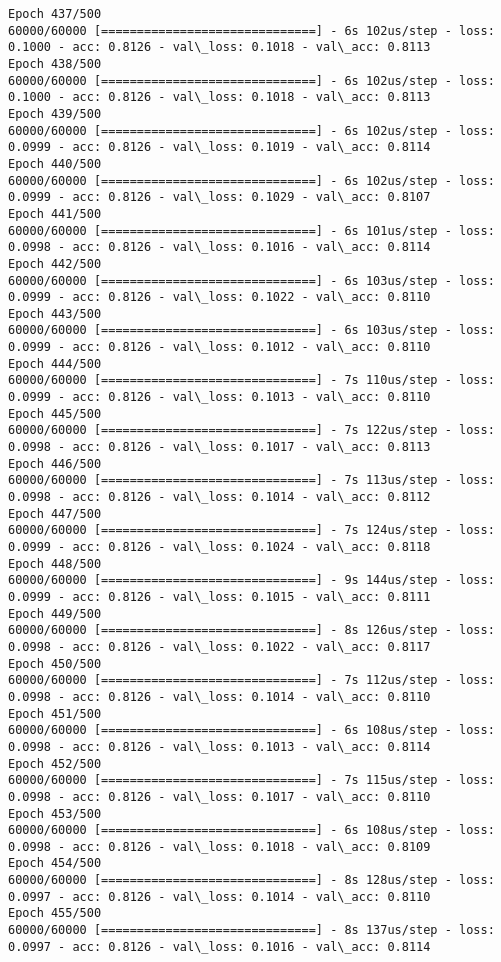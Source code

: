 \documentclass[11pt]{article}
\begin{document}
\begin{Verbatim}[commandchars=\\\{\}]
Epoch 437/500
60000/60000 [==============================] - 6s 102us/step - loss: 0.1000 - acc: 0.8126 - val\_loss: 0.1018 - val\_acc: 0.8113
Epoch 438/500
60000/60000 [==============================] - 6s 102us/step - loss: 0.1000 - acc: 0.8126 - val\_loss: 0.1018 - val\_acc: 0.8113
Epoch 439/500
60000/60000 [==============================] - 6s 102us/step - loss: 0.0999 - acc: 0.8126 - val\_loss: 0.1019 - val\_acc: 0.8114
Epoch 440/500
60000/60000 [==============================] - 6s 102us/step - loss: 0.0999 - acc: 0.8126 - val\_loss: 0.1029 - val\_acc: 0.8107
Epoch 441/500
60000/60000 [==============================] - 6s 101us/step - loss: 0.0998 - acc: 0.8126 - val\_loss: 0.1016 - val\_acc: 0.8114
Epoch 442/500
60000/60000 [==============================] - 6s 103us/step - loss: 0.0999 - acc: 0.8126 - val\_loss: 0.1022 - val\_acc: 0.8110
Epoch 443/500
60000/60000 [==============================] - 6s 103us/step - loss: 0.0999 - acc: 0.8126 - val\_loss: 0.1012 - val\_acc: 0.8110
Epoch 444/500
60000/60000 [==============================] - 7s 110us/step - loss: 0.0999 - acc: 0.8126 - val\_loss: 0.1013 - val\_acc: 0.8110
Epoch 445/500
60000/60000 [==============================] - 7s 122us/step - loss: 0.0998 - acc: 0.8126 - val\_loss: 0.1017 - val\_acc: 0.8113
Epoch 446/500
60000/60000 [==============================] - 7s 113us/step - loss: 0.0998 - acc: 0.8126 - val\_loss: 0.1014 - val\_acc: 0.8112
Epoch 447/500
60000/60000 [==============================] - 7s 124us/step - loss: 0.0999 - acc: 0.8126 - val\_loss: 0.1024 - val\_acc: 0.8118
Epoch 448/500
60000/60000 [==============================] - 9s 144us/step - loss: 0.0999 - acc: 0.8126 - val\_loss: 0.1015 - val\_acc: 0.8111
Epoch 449/500
60000/60000 [==============================] - 8s 126us/step - loss: 0.0998 - acc: 0.8126 - val\_loss: 0.1022 - val\_acc: 0.8117
Epoch 450/500
60000/60000 [==============================] - 7s 112us/step - loss: 0.0998 - acc: 0.8126 - val\_loss: 0.1014 - val\_acc: 0.8110
Epoch 451/500
60000/60000 [==============================] - 6s 108us/step - loss: 0.0998 - acc: 0.8126 - val\_loss: 0.1013 - val\_acc: 0.8114
Epoch 452/500
60000/60000 [==============================] - 7s 115us/step - loss: 0.0998 - acc: 0.8126 - val\_loss: 0.1017 - val\_acc: 0.8110
Epoch 453/500
60000/60000 [==============================] - 6s 108us/step - loss: 0.0998 - acc: 0.8126 - val\_loss: 0.1018 - val\_acc: 0.8109
Epoch 454/500
60000/60000 [==============================] - 8s 128us/step - loss: 0.0997 - acc: 0.8126 - val\_loss: 0.1014 - val\_acc: 0.8110
Epoch 455/500
60000/60000 [==============================] - 8s 137us/step - loss: 0.0997 - acc: 0.8126 - val\_loss: 0.1016 - val\_acc: 0.8114

\end{Verbatim}
\end{document}

